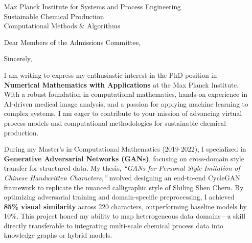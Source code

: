 \documentclass[11pt,a4paper, final]{moderncv}
\begin{document}
{Max Planck Institute for Systems and Process Engineering\\
Sustainable Chemical Production\\
Computational Methods \& Algorithms\\
}
\date{\today}
\opening{Dear Members of the Admissions Committee,}
\closing{Sincerely,}
\makelettertitle
\thispagestyle{empty}
\pagestyle{empty}
I am writing to express my enthusiastic interest in the PhD position 
in \textbf{Numerical Mathematics with Applications} at the Max Planck Institute. 
With a robust foundation in computational mathematics, hands-on experience in AI-driven medical image analysis, 
and a passion for applying machine learning to complex systems, 
I am eager to contribute to your mission of advancing virtual process models and computational methodologies for sustainable chemical production.

During my Master's in Computational Mathematics (2019-2022), 
I specialized in \textbf{Generative Adversarial Networks (GANs)}, 
focusing on cross-domain style transfer for structured data. 
My thesis, \emph{``GANs for Personal Style Imitation of Chinese Handwritten Characters,''} 
nvolved designing an end-to-end CycleGAN framework to replicate the nuanced calligraphic style of Shiling Shen Chern. 
By optimizing adversarial training and domain-specific preprocessing, 
I achieved \textbf{85\% visual similarity} across 220 characters, outperforming baseline models by 10\%. 
This project honed my ability to map heterogeneous data domains—a skill directly transferable to integrating multi-scale chemical process data into knowledge graphs or hybrid models.
\end{document}
